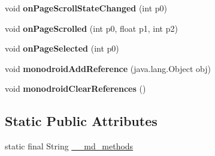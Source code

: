 \begin{DoxyCompactItemize}
void {\bfseries on\+Page\+Scroll\+State\+Changed} (int p0)
\item 
\mbox{\label{classmd5270abb39e60627f0f200893b490a1ade_1_1CarouselPageRenderer_abe81b3e31f566f0d59f1a198578b3541}} 
void {\bfseries on\+Page\+Scrolled} (int p0, float p1, int p2)
\item 
\mbox{\label{classmd5270abb39e60627f0f200893b490a1ade_1_1CarouselPageRenderer_aa3c0ad81abb02d7454b2ceed0de08148}} 
void {\bfseries on\+Page\+Selected} (int p0)
\item 
\mbox{\label{classmd5270abb39e60627f0f200893b490a1ade_1_1CarouselPageRenderer_a26e779e0778b3b8b22f6f7a8e20f1e7e}} 
void {\bfseries monodroid\+Add\+Reference} (java.\+lang.\+Object obj)
\item 
\mbox{\label{classmd5270abb39e60627f0f200893b490a1ade_1_1CarouselPageRenderer_a7f418b0c33eb2a6154244df3ce1ab3d0}} 
void {\bfseries monodroid\+Clear\+References} ()
\end{DoxyCompactItemize}
\subsection*{Static Public Attributes}
\begin{DoxyCompactItemize}
\item 
static final String \hyperlink{classmd5270abb39e60627f0f200893b490a1ade_1_1CarouselPageRenderer_a30dd5844560aeae1db3e3ff655ce8f76}{\+\_\+\+\_\+md\+\_\+methods}
\end{DoxyCompactItemize}
